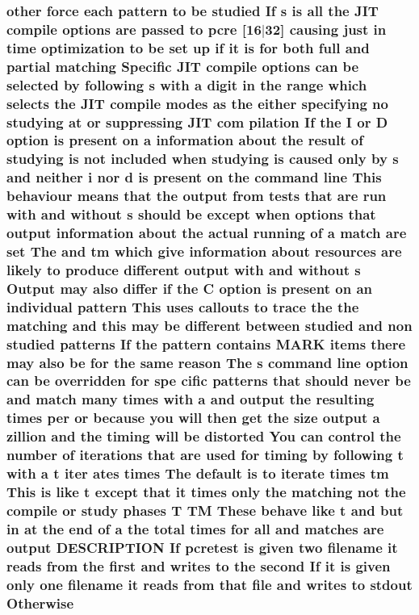 \subsubsection[{\texorpdfstring{Otherwise}{Otherwise}}]{ other force each {\bf pattern} {\bf to} {\bf be} {\bf studied} If {\bf s} {\bf is} {\bf all} the J\+IT {\bf compile} {\bf options} {\bf are} passed {\bf to} {\bf pcre} \mbox{[}16$\vert$32\mbox{]} causing just {\bf in} {\bf time} optimization {\bf to} {\bf be} {\bf set} up {\bf if} {\bf it} {\bf is} for both full and {\bf partial} {\bf matching} Specific J\+IT {\bf compile} {\bf options} {\bf can} {\bf be} {\bf selected} by following {\bf s} {\bf with} {\bf a} digit {\bf in} the range {\bf which} selects the J\+IT {\bf compile} {\bf modes} {\bf as} the either {\bf specifying} no {\bf studying} at {\bf or} suppressing J\+IT com pilation If the {\bf I} {\bf or} {\bf D} {\bf option} {\bf is} {\bf present} {\bf on} {\bf a} information about the {\bf result} {\bf of} {\bf studying} {\bf is} {\bf not} {\bf included} when {\bf studying} {\bf is} caused only by {\bf s} and neither {\bf i} nor {\bf d} {\bf is} {\bf present} {\bf on} the {\bf command} {\bf line} This behaviour means that the {\bf output} {\bf from} {\bf tests} that {\bf are} {\bf run} {\bf with} and without {\bf s} should {\bf be} {\bf except} when {\bf options} that {\bf output} information about the actual running {\bf of} {\bf a} {\bf match} {\bf are} {\bf set} The and {\bf tm} {\bf which} give information about resources {\bf are} likely {\bf to} produce different {\bf output} {\bf with} and without {\bf s} Output may also differ {\bf if} the {\bf C} {\bf option} {\bf is} {\bf present} {\bf on} an individual {\bf pattern} This uses callouts {\bf to} trace the the {\bf matching} and {\bf this} may {\bf be} different between {\bf studied} and non {\bf studied} {\bf patterns} If the {\bf pattern} {\bf contains} M\+A\+RK items there may also {\bf be} for the same {\bf reason} The {\bf s} {\bf command} {\bf line} {\bf option} {\bf can} {\bf be} overridden for spe cific {\bf patterns} that should never {\bf be} and {\bf match} many {\bf times} {\bf with} {\bf a} and {\bf output} the resulting {\bf times} per {\bf or} because you will then get the {\bf size} {\bf output} {\bf a} zillion and the timing will {\bf be} distorted You {\bf can} control the {\bf number} {\bf of} iterations that {\bf are} {\bf used} for timing by following {\bf t} {\bf with} {\bf a} {\bf t} {\bf iter} ates {\bf times} The {\bf default} {\bf is} {\bf to} iterate {\bf times} {\bf tm} This {\bf is} like {\bf t} {\bf except} that {\bf it} {\bf times} only the {\bf matching} {\bf not} the {\bf compile} {\bf or} {\bf study} phases {\bf T} TM These behave like {\bf t} and but {\bf in} at the {\bf end} {\bf of} {\bf a} the total {\bf times} for {\bf all} and {\bf matches} {\bf are} {\bf output} D\+E\+S\+C\+R\+I\+P\+T\+I\+ON If {\bf pcretest} {\bf is} {\bf given} two {\bf filename} {\bf it} reads {\bf from} the {\bf first} and writes {\bf to} the {\bf second} If {\bf it} {\bf is} {\bf given} only one {\bf filename} {\bf it} reads {\bf from} that {\bf file} and writes {\bf to} {\bf stdout} Otherwise}\hypertarget{pcretest_8txt_a867535c556571c3e4ad2380f3b400e97}{}\label{pcretest_8txt_a867535c556571c3e4ad2380f3b400e97}

